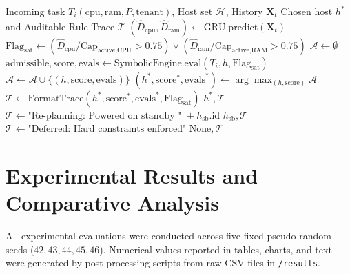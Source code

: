 \documentclass[conference]{IEEEtran}
\begin{document}
\begin{algorithm}[htbp]
\caption{Neuro-Symbolic Cloud Resource Allocation}
\label{alg:neuro_symbolic}
\begin{algorithmic}[1]
\REQUIRE Incoming task $T_i(\text{cpu}, \text{ram}, P, \text{tenant})$, Host set $\mathcal{H}$, History $\mathbf{X}_t$
\ENSURE Chosen host $h^*$ and Auditable Rule Trace $\mathcal{T}$
\STATE $(\hat{D}_{\text{cpu}}, \hat{D}_{\text{ram}}) \leftarrow \text{GRU.predict}(\mathbf{X}_t)$
\STATE $\text{Flag}_{\text{sat}} \leftarrow (\hat{D}_{\text{cpu}} / \text{Cap}_{\text{active},\text{CPU}} > 0.75) \lor (\hat{D}_{\text{ram}} / \text{Cap}_{\text{active},\text{RAM}} > 0.75)$
\STATE $\mathcal{A} \leftarrow \emptyset$ 
    \STATE $\text{admissible}, \text{score}, \text{evals} \leftarrow \text{SymbolicEngine.eval}(T_i, h, \text{Flag}_{\text{sat}})$
        \STATE $\mathcal{A} \leftarrow \mathcal{A} \cup \{(h, \text{score}, \text{evals})\}$
    \ENDIF
\ENDFOR
{}
    \STATE $(h^*, \text{score}^*, \text{evals}^*) \leftarrow \arg\max_{(h, \text{score})} \mathcal{A}$
    \STATE $\mathcal{T} \leftarrow \text{FormatTrace}(h^*, \text{score}^*, \text{evals}^*, \text{Flag}_{\text{sat}})$
    \RETURN $h^*, \mathcal{T}$
\ENDIF
{}
        \STATE $\mathcal{T} \leftarrow \text{"Re-planning: Powered on standby " } + h_{\text{sb}}.\text{id}$
        \RETURN $h_{\text{sb}}, \mathcal{T}$
    \ENDIF
\ENDFOR
\STATE $\mathcal{T} \leftarrow \text{"Deferred: Hard constraints enforced"}$
\RETURN $\text{None}, \mathcal{T}$
\end{algorithmic}
\end{algorithm}

\section{Experimental Results and Comparative Analysis}
All experimental evaluations were conducted across five fixed pseudo-random seeds ($42, 43, 44, 45, 46$). Numerical values reported in tables, charts, and text were generated by post-processing scripts from raw CSV files in \texttt{/results}.
\end{document}
